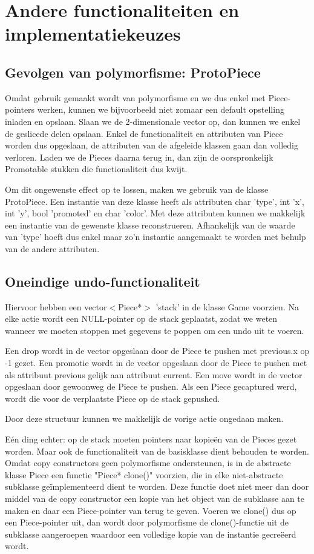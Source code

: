 \documentclass[a4paper,11pt,oneside, titlepage]{article}
\begin{document}
\section{Andere functionaliteiten en implementatiekeuzes}
\subsection{Gevolgen van polymorfisme: ProtoPiece}
Omdat gebruik gemaakt wordt van polymorfisme en we dus enkel met Piece-pointers werken, kunnen we bijvoorbeeld niet zomaar een default opstelling inladen en opslaan. Slaan we de 2-dimensionale vector op, dan kunnen we enkel de geslicede delen opslaan. Enkel de functionaliteit en attributen van Piece worden dus opgeslaan, de attributen van de afgeleide klassen gaan dan volledig verloren. Laden we de Pieces daarna terug in, dan zijn de oorspronkelijk Promotable stukken die functionaliteit dus kwijt.

Om dit ongewenste effect op te lossen, maken we gebruik van de klasse ProtoPiece. Een instantie van deze klasse heeft als attributen char 'type', int 'x', int 'y', bool 'promoted' en char 'color'. Met deze attributen kunnen we makkelijk een instantie van de gewenste klasse reconstrueren. Afhankelijk van de waarde van 'type' hoeft dus enkel maar zo'n instantie aangemaakt te worden met behulp van de andere attributen.
\subsection{Oneindige undo-functionaliteit}
Hiervoor hebben een vector$<$Piece*$>$ 'stack' in de klasse Game voorzien. Na elke actie wordt een NULL-pointer op de stack geplaatst, zodat we weten wanneer we moeten stoppen met gegevens te poppen om een undo uit te voeren.

Een drop wordt in de vector opgeslaan door de Piece te pushen met previous.x op -1 gezet. Een promotie wordt in de vector opgeslaan door de Piece te pushen met als attribuut previous gelijk aan attribuut current. Een move wordt in de vector opgeslaan door gewoonweg de Piece te pushen. Als een Piece gecaptured werd, wordt die voor de verplaatste Piece op de stack gepushed.

Door deze structuur kunnen we makkelijk de vorige actie ongedaan maken.

E\'en ding echter: op de stack moeten pointers naar kopie\"en van de Pieces gezet worden. Maar ook de functionaliteit van de basisklasse dient behouden te worden. Omdat copy constructors geen polymorfisme ondersteunen, is in de abstracte klasse Piece een functie "Piece* clone()" voorzien, die in elke niet-abstracte subklasse ge\"implementeerd dient te worden. Deze functie doet niet meer dan door middel van de copy constructor een kopie van het object van de subklasse aan te maken en daar een Piece-pointer van terug te geven. Voeren we clone() dus op een Piece-pointer uit, dan wordt door polymorfisme de clone()-functie uit de subklasse aangeroepen waardoor een volledige kopie van de instantie gecre\"eerd wordt.
\end{document}
